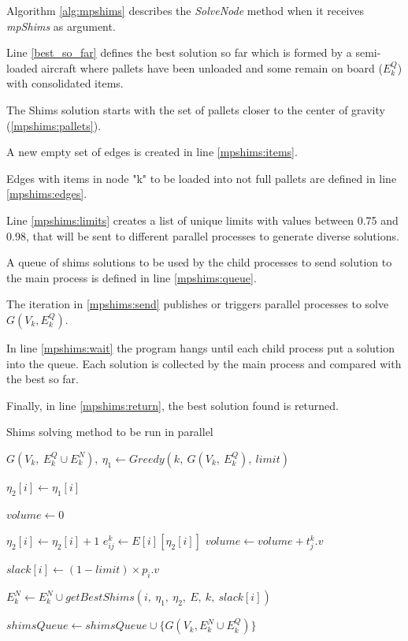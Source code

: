 \documentclass[preprint,authoryear]{elsarticle}
\begin{document}
Algorithm \ref{alg:mpshims} describes the {\it SolveNode} method when it receives {\it mpShims} as argument.

Line \ref{best_so_far} defines the best solution so far which is formed by a semi-loaded aircraft where pallets have been unloaded and some remain on board ($E^Q_k$) with consolidated items.

The Shims solution starts with the set of pallets closer to the center of gravity (\ref{mpshims:pallets}).

A new empty set of edges is created in line \ref{mpshims:items}.

Edges with items in node "k" to be loaded into not full pallets are defined in line \ref{mpshims:edges}.

Line \ref{mpshims:limits} creates a list of unique limits with values between 0.75 and 0.98, that will be sent to different parallel processes to generate diverse solutions.

A queue of shims solutions to be used by the child processes to send solution to the main process is defined in line \ref{mpshims:queue}.

The iteration in \ref{mpshims:send} publishes or triggers parallel processes to solve $G(V_k, E^Q_k)$.

In line \ref{mpshims:wait} the program hangs until each child process put a solution into the queue. Each solution is collected by the main process and compared with the best so far.

Finally, in line \ref{mpshims:return}, the best solution found is returned.


\begin{algorithm}[H]
	\caption{Shims solving method to be run in parallel}  \label{alg:shimsSolve}
	\begin{algorithmic}[1]
		
		
		\State $G(V_k,\ E^Q_k \cup E^N_k),\ \eta_1 \gets Greedy(k,\ G(V_k,\ E^Q_k),\ limit)$ \label{first_phase}
				
	
			\State $\eta_2[i] \gets \eta_1[i]$	
			
			\State $volume \gets 0$	

			\Repeat \label{second_phase_begin}
				\State $\eta_2[i] \gets \eta_2[i] + 1$ 
				\State $e^k_{ij} \gets E[i][\eta_2[i]]$
				\State $volume \gets volume + t^k_j.v$
			 \label{second_phase_end}
			
			\State $slack[i] \gets (1-limit) \times p_i.v$
			
			\State $E^N_k \gets E^N_k \cup getBestShims(i,\ \eta_1,\ \eta_2,\ E,\ k,\ slack[i])$ \label{third_phase}
		
		\EndFor
		
		\State $shimsQueue \gets shimsQueue \cup \{G(V_k, E^N_k \cup E^Q_k)\}$ \label{enqueue}
		
		\EndProcedure
		
	\end{algorithmic}
\end{algorithm}
\end{document}
